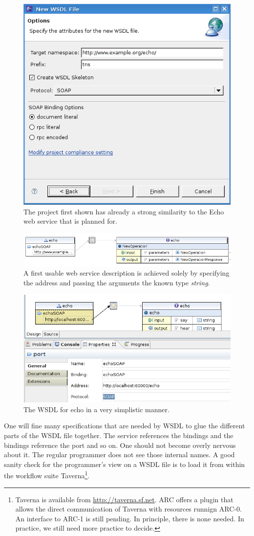 \begin{figure}
\includegraphics[width=.4\columnwidth]{wsdl_defaultSettings.png}
\caption{The project first shown has already a strong similarity to the Echo
web service that is planned for.}
\end{figure}

\begin{figure}
\includegraphics[width=.4\columnwidth]{wsdl_defaultProject.png}
\caption{A first usable web service description is achieved solely by
specifying the address and passing the arguments the known type
\textit{string}.}
\end{figure}

\begin{figure}
\includegraphics[width=.4\columnwidth]{wsdl_EchoSimplest.png}
\caption{The WSDL for echo in a very simplistic manner.}
\label{fig:simpleEchoService}
\end{figure}

One will fine many specifications that are needed by WSDL to glue the different
parts of the WSDL file together. The service references the bindings and the
bindings reference the port and so on. One should not become overly nervous
about it. The regular programmer does not see those internal names. A good
sanity check for the programmer's view on a WSDL file is to load it from within
the workflow suite Taverna\footnote{Taverna is available from
\url{http://taverna.sf.net}. ARC offers a plugin that allows the direct
communication of Taverna with resources runnign ARC-0. An interface to ARC-1
is still pending. In principle, there is none needed. In practice, we still need
more practice to decide.}.

